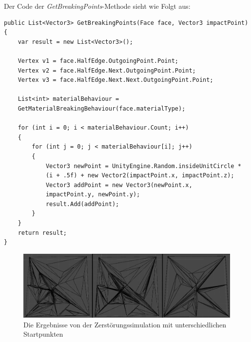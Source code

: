 Der Code der \textit{GetBreakingPoints}-Methode sieht wie Folgt aus:
\begin{lstlisting}
public List<Vector3> GetBreakingPoints(Face face, Vector3 impactPoint)
{
	var result = new List<Vector3>();
	
	Vertex v1 = face.HalfEdge.OutgoingPoint.Point;
	Vertex v2 = face.HalfEdge.Next.OutgoingPoint.Point;
	Vertex v3 = face.HalfEdge.Next.Next.OutgoingPoint.Point;
	
	List<int> materialBehaviour =
	GetMaterialBreakingBehaviour(face.materialType);
	
	for (int i = 0; i < materialBehaviour.Count; i++)
	{
		for (int j = 0; j < materialBehaviour[i]; j++)
		{
			Vector3 newPoint = UnityEngine.Random.insideUnitCircle *
			(i + .5f) + new Vector2(impactPoint.x, impactPoint.z);
			Vector3 addPoint = new Vector3(newPoint.x,
			impactPoint.y, newPoint.y);
			result.Add(addPoint);
		}
	}
	return result;
}

\end{lstlisting}
\begin{figure}[H]
	\centering
	\includegraphics[width=0.9\linewidth]{Images/DestructionExample}
	\caption{Die Ergebnisse von der Zerst\"orungssimulation mit unterschiedlichen Startpunkten}
	\label{fig:destructionexample}
\end{figure}
